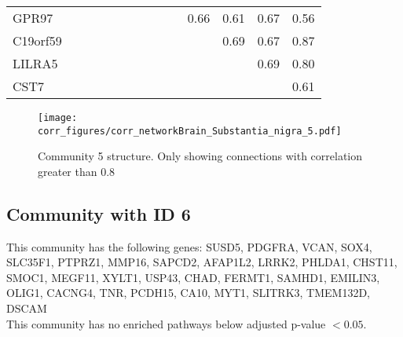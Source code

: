 \begin{longtable}{lrrrrrrrrrrrrr}
GPR97    &              &               &              &              &             &             &            &            &             &           0.66 &         0.61 &       0.67 &       0.56 \\
C19orf59 &              &               &              &              &             &             &            &            &             &                &         0.69 &       0.67 &       0.87 \\
LILRA5   &              &               &              &              &             &             &            &            &             &                &              &       0.69 &       0.80 \\
CST7     &              &               &              &              &             &             &            &            &             &                &              &            &       0.61 \\
\end{longtable}


\begin{figure}[h!]
\centering
\texttt{[image: corr\_figures/corr\_networkBrain\_Substantia\_nigra\_5.pdf]}
\caption{Community 5 structure. Only showing connections with correlation greater than 0.8}
\end{figure}




\subsection*{Community with ID 6}
This community has the following genes: SUSD5, PDGFRA, VCAN, SOX4, SLC35F1, PTPRZ1, MMP16, SAPCD2, AFAP1L2, LRRK2, PHLDA1, CHST11, SMOC1, MEGF11, XYLT1, USP43, CHAD, FERMT1, SAMHD1, EMILIN3, OLIG1, CACNG4, TNR, PCDH15, CA10, MYT1, SLITRK3, TMEM132D, DSCAM
\\
This community has no enriched pathways below adjusted p-value $< 0.05$.

